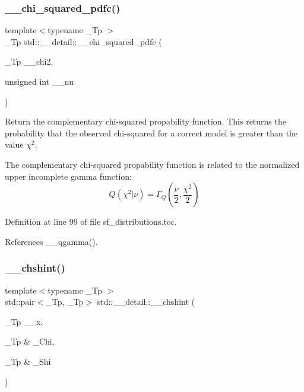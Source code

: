 \subsubsection{\texorpdfstring{\+\_\+\+\_\+chi\+\_\+squared\+\_\+pdfc()}{\_\_chi\_squared\_pdfc()}}
{\footnotesize\ttfamily template$<$typename \+\_\+\+Tp $>$ \\
\+\_\+\+Tp std\+::\+\_\+\+\_\+detail\+::\+\_\+\+\_\+chi\+\_\+squared\+\_\+pdfc (\begin{DoxyParamCaption}\item[{\+\_\+\+Tp}]{\+\_\+\+\_\+chi2,  }\item[{unsigned int}]{\+\_\+\+\_\+nu }\end{DoxyParamCaption})}



Return the complementary chi-\/squared propability function. This returns the probability that the observed chi-\/squared for a correct model is greater than the value $ \chi^2 $. 

The complementary chi-\/squared propability function is related to the normalized upper incomplete gamma function\+: \[ Q(\chi^2|\nu) = \Gamma_Q(\frac{\nu}{2}, \frac{\chi^2}{2}) \] 

Definition at line 99 of file sf\+\_\+distributions.\+tcc.



References \+\_\+\+\_\+qgamma().

\mbox{\label{namespacestd_1_1____detail_aa07abc4dac6cf589ccd12d3ce40277cf}} 
\subsubsection{\texorpdfstring{\+\_\+\+\_\+chshint()}{\_\_chshint()}}
{\footnotesize\ttfamily template$<$typename \+\_\+\+Tp $>$ \\
std\+::pair$<$\+\_\+\+Tp, \+\_\+\+Tp$>$ std\+::\+\_\+\+\_\+detail\+::\+\_\+\+\_\+chshint (\begin{DoxyParamCaption}\item[{\+\_\+\+Tp}]{\+\_\+\+\_\+x,  }\item[{\+\_\+\+Tp \&}]{\+\_\+\+Chi,  }\item[{\+\_\+\+Tp \&}]{\+\_\+\+Shi }\end{DoxyParamCaption})}



